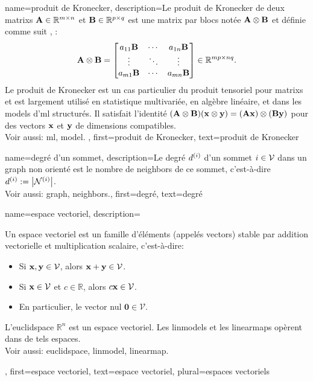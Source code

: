 {name={produit de Kronecker}, 
	description={Le produit de Kronecker  de deux \glspl{matrix} ${\bf A} \in \mathbb{R}^{m \times n}$ 
		et ${\bf B} \in \mathbb{R}^{p \times q}$ est une \gls{matrix} par blocs notée ${\bf A} \otimes {\bf B}$ 
		et définie comme suit \cite{GolubVanLoanBook}, \cite{HornMatAnalysis}:
		\[
		{\bf A} \otimes {\bf B} =
		\begin{bmatrix}
			a_{11}{\bf B} & \cdots & a_{1n}{\bf B} \\
			\vdots & \ddots & \vdots \\
			a_{m1}{\bf B} & \cdots & a_{mn}{\bf B}
		\end{bmatrix}
		\in \mathbb{R}^{mp \times nq}.
		\]
		Le produit de Kronecker est un cas particulier du produit tensoriel pour \glspl{matrix} et est largement utilisé en statistique multivariée, en algèbre linéaire, et dans les \glspl{model} d'\gls{ml} structurés.  
		Il satisfait l’identité $({\bf A} \otimes {\bf B})({\bf x} \otimes {\bf y}) = ({\bf A}{\bf x}) \otimes ({\bf B}{\bf y})$ pour des \glspl{vector} ${\bf x}$ et ${\bf y}$ de dimensions compatibles.
		\\
		Voir aussi: \gls{ml}, \gls{model}. },
	first={produit de Kronecker},
	text={produit de Kronecker} 
}

{name={degré d’un sommet},
	description={Le degré $d^{(i)}$ d’un sommet $i \in \mathcal{V}$ 
		dans un \gls{graph} non orienté est le nombre de \gls{neighbors} de ce sommet, c’est-à-dire 
		$d^{(i)} := \big|\mathcal{N}^{(i)}\big|$.
		\\ 
		Voir aussi: \gls{graph}, \gls{neighbors}.},
	first={degré},
	text={degré} 
}

{name={espace vectoriel},
	description={Un espace vectoriel est un famille d’éléments 
		(appelés \glspl{vector}) stable par addition vectorielle et multiplication scalaire, c’est-à-dire:
		\begin{itemize}
			\item Si ${\bf x}, {\bf y} \in \mathcal{V}$, alors ${\bf x} + {\bf y} \in \mathcal{V}$.
			\item Si ${\bf x} \in \mathcal{V}$ et $c \in \mathbb{R}$, alors $c {\bf x} \in \mathcal{V}$.
			\item En particulier, le \gls{vector} nul $\mathbf{0} \in \mathcal{V}$.
		\end{itemize}
		L’\gls{euclidspace} $\mathbb{R}^n$ est un espace vectoriel.
		Les \glspl{linmodel} et les \glspl{linearmap} opèrent dans de tels espaces.
		\\
		Voir aussi: \gls{euclidspace}, \gls{linmodel}, \gls{linearmap}.},
	first={espace vectoriel},
	text={espace vectoriel}, plural={espaces vectoriels}
}

